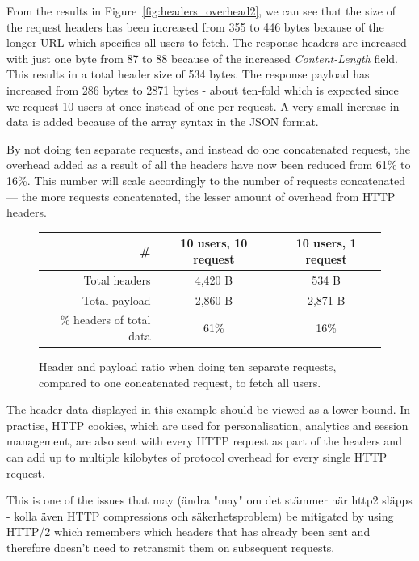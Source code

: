 \documentclass{cslthse-msc}
\begin{document}
From the results in Figure~\ref{fig:headers_overhead2}, we can see that the size of the request headers has been increased from 355 to 446 bytes because of the longer URL which specifies all users to fetch. The response headers are increased with just one byte from 87 to 88 because of the increased \emph{Content-Length} field. This results in a total header size of 534 bytes. The response payload has increased from 286 bytes to 2871 bytes - about ten-fold which is expected since we request 10 users at once instead of one per request. A very small increase in data is added because of the array syntax in the JSON format. 

By not doing ten separate requests, and instead do one concatenated request, the overhead added as a result of all the headers have now been reduced from 61\% to 16\%. This number will scale accordingly to the number of requests concatenated --- the more requests concatenated, the lesser amount of overhead from HTTP headers.

\begin{figure}[H]
  \centering
    \begin{center}
      \begin{tabular}{ r | c | c }
        \textbf{\#} & \textbf{10 users, 10 request} & \textbf{10 users, 1 request} \\ \hline
        Total headers & 4,420 B & 534 B \\ \hline
        Total payload & 2,860 B & 2,871 B \\ \hline
        \% headers of total data & 61\% & 16\% \\ \hline
      \end{tabular}
    \end{center}
  \caption{Header and payload ratio when doing ten separate requests, compared to one concatenated request, to fetch all users.}
\end{figure}

The header data displayed in this example should be viewed as a lower bound. In practise, HTTP cookies, which are used for personalisation, analytics and session management, are also sent with every HTTP request as part of the headers and can add up to multiple kilobytes of protocol overhead for every single HTTP request\cite[page 200]{HPBN}.

This is one of the issues that may (ändra "may" om det stämmer när http2 släpps - kolla även HTTP compressions och säkerhetsproblem) be mitigated by using HTTP/2 which remembers which headers that has already been sent and therefore doesn't need to retransmit them on subsequent requests\cite[page 222]{HPBN}.
\end{document}

